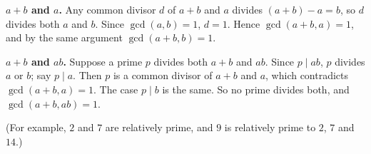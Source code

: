 \textbf{$a+b$ and $a$.} Any common divisor $d$ of $a+b$ and $a$ divides $(a+b)-a=b$, so $d$ divides both $a$ and $b$. Since $\gcd(a,b)=1$, $d=1$. Hence $\gcd(a+b,a)=1$, and by the same argument $\gcd(a+b,b)=1$.

\textbf{$a+b$ and $ab$.} Suppose a prime $p$ divides both $a+b$ and $ab$. Since $p\mid ab$, $p$ divides $a$ or $b$; say $p\mid a$. Then $p$ is a common divisor of $a+b$ and $a$, which contradicts $\gcd(a+b,a)=1$. The case $p\mid b$ is the same. So no prime divides both, and $\gcd(a+b,ab)=1$.

(For example, $2$ and $7$ are relatively prime, and $9$ is relatively prime to $2$, $7$ and $14$.)
